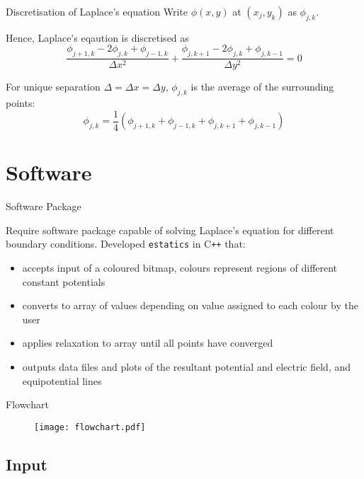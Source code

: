 \documentclass{beamer}
\newcommand{\be}{\begin{equation}}
\newcommand{\ee}{\end{equation}}
\begin{document}
\begin{frame}{Discretisation of Laplace's equation}
Write $\phi(x,y)$ at $(x_j,y_k)$ as $\phi_{j,k}$.

Hence, Laplace's eqaution is discretised as
%
\be
\frac{\phi_{j+1,k}-2\phi_{j,k}+\phi_{j-1,k}}{\Delta x^2} + \frac{\phi_{j,k+1}-2\phi_{j,k}+\phi_{j,k-1}}{\Delta y^2}=0
\ee

For unique separation $\Delta = \Delta x = \Delta y$, $\phi_{j,k}$ is the average of the
surrounding points:
%
\be
\phi_{j,k}= \frac{1}{4}(\phi_{j+1,k}+\phi_{j-1,k}+\phi_{j,k+1}+\phi_{j,k-1})
\ee

\end{frame}

\section{Software}

\begin{frame}{Software Package}

Require software package capable of solving Laplace’s equation for different boundary
conditions. Developed \texttt{estatics} in C\texttt{++} that:
\begin{itemize}
\item accepts input of a coloured bitmap, colours represent regions of different constant potentials
\item converts to array of values depending on value assigned to each colour by the user
\item applies relaxation to array until all points have converged
\item outputs data files and plots of the resultant potential and electric field, and equipotential lines
\end{itemize}

\end{frame}

\begin{frame}{Flowchart}
\begin{figure}
\centerline{
\texttt{[image: flowchart.pdf]}
}
\end{figure}
\end{frame}

\subsection{Input}
\end{document}
